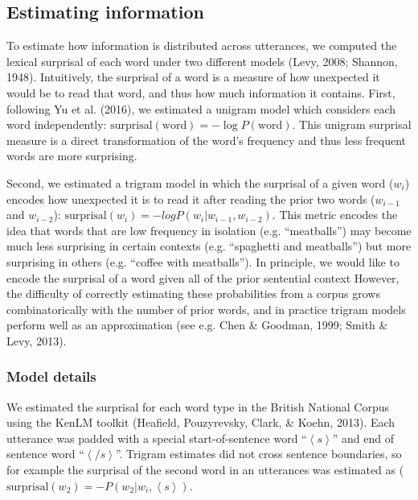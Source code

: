 \documentclass[10pt, letterpaper]{article}
\begin{document}
\hypertarget{estimating-information}{%
\subsection{Estimating information}\label{estimating-information}}

To estimate how information is distributed across utterances, we
computed the lexical surprisal of each word under two different models
(Levy, 2008; Shannon, 1948). Intuitively, the surprisal of a word is a
measure of how unexpected it would be to read that word, and thus how
much information it contains. First, following Yu et al. (2016), we
estimated a unigram model which considers each word independently:
\(\text{surprisal}(\text{word}) = -\log P(\text{word})\). This unigram
surprisal measure is a direct transformation of the word's frequency and
thus less frequent words are more surprising.

Second, we estimated a trigram model in which the surprisal of a given
word (\(w_i\)) encodes how unexpected it is to read it after reading the
prior two words (\(w_{i-1}\) and \(w_{i-2}\)):
\(\text{surprisal}(w_{i}) = -log P(w_i|w_{i-1},w_{i-2})\). This metric
encodes the idea that words that are low frequency in isolation (e.g.
``meatballs'') may become much less surprising in certain contexts (e.g.
``spaghetti and meatballs'') but more surprising in others (e.g.
``coffee with meatballs''). In principle, we would like to encode the
surprisal of a word given all of the prior sentential context However,
the difficulty of correctly estimating these probabilities from a corpus
grows combinatorically with the number of prior words, and in practice
trigram models perform well as an approximation (see e.g. Chen \&
Goodman, 1999; Smith \& Levy, 2013).

\hypertarget{model-details}{%
\subsubsection{Model details}\label{model-details}}

We estimated the surprisal for each word type in the British National
Corpus using the KenLM toolkit (Heafield, Pouzyrevsky, Clark, \& Koehn,
2013). Each utterance was padded with a special start-of-sentence word
``\(\left<s\right>\)'' and end of sentence word ``\(\left</s\right>\)''.
Trigram estimates did not cross sentence boundaries, so for example the
surprisal of the second word in an utterances was estimated as
(\(\text{surprisal}(w_{2}) = -P(w_2|w_{i},\left<s\right>)\).
\end{document}
